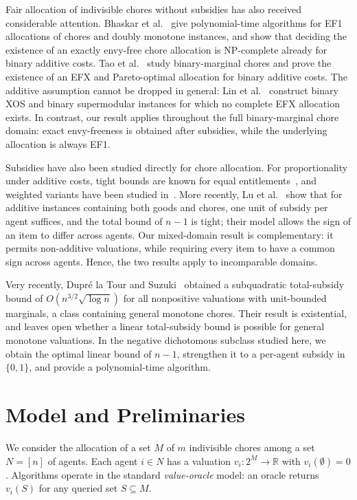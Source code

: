 \documentclass[sigconf,anonymous]{aamas}
\newcommand{\agents}{N}
\newcommand{\items}{M}
\newcommand{\R}{\mathbb{R}}
\theoremstyle{acmplain}
\theoremstyle{acmdefinition}
\theoremstyle{acmplain}
\begin{document}
Fair allocation of indivisible chores without subsidies has also received considerable attention. Bhaskar et al.~\cite{BSV21} give polynomial-time algorithms for EF1 allocations of chores and doubly monotone instances, and show that deciding the existence of an exactly envy-free chore allocation is NP-complete already for binary additive costs. Tao et al.~\cite{tao2025existence} study binary-marginal chores and prove the existence of an EFX and Pareto-optimal allocation for binary additive costs. The additive assumption cannot be dropped in general: Lin et al.~\cite{LLTZ26} construct binary XOS and binary supermodular instances for which no complete EFX allocation exists. In contrast, our result applies throughout the full binary-marginal chore domain: exact envy-freeness is obtained after subsidies, while the underlying allocation is always EF1.

Subsidies have also been studied directly for chore allocation. For proportionality under additive costs, tight bounds are known for equal entitlements~\cite{wu2025revisiting}, and weighted variants have been studied in~\cite{wu2024tree,GSW25}.  More recently, Lu et al.~\cite{LMS26} show that for additive instances containing both goods and chores, one unit of subsidy per agent suffices, and the total bound of $n-1$ is tight; their model allows the sign of an item to differ across agents. Our mixed-domain result is complementary: it permits non-additive valuations, while requiring every item to have a common sign across agents. Hence, the two results apply to incomparable domains.

Very recently, Dupr\'e la Tour and Suzuki~\cite{la2026subquadratic} obtained a subquadratic total-subsidy bound of $O(n^{3/2}\sqrt{\log n})$ for all nonpositive valuations with unit-bounded
marginals, a class containing general monotone chores. Their result is existential, and leaves open whether a linear total-subsidy bound is possible for general monotone valuations. In the negative dichotomous subclass studied here, we obtain the optimal linear bound of $n-1$, strengthen it to a per-agent subsidy in $\{0,1\}$, and provide a polynomial-time algorithm.



\section{Model and Preliminaries}
\label{sec:prelim}

We consider the allocation of a set $\items$ of $m$ indivisible chores among a set $\agents=[n]$ of agents. Each agent $i\in\agents$ has a valuation $v_i:2^{\items}\to\R$ with $v_i(\emptyset)=0$. Algorithms operate in the standard \emph{value-oracle} model: an oracle returns $v_i(S)$ for any queried set $S\subseteq\items$.
\end{document}
